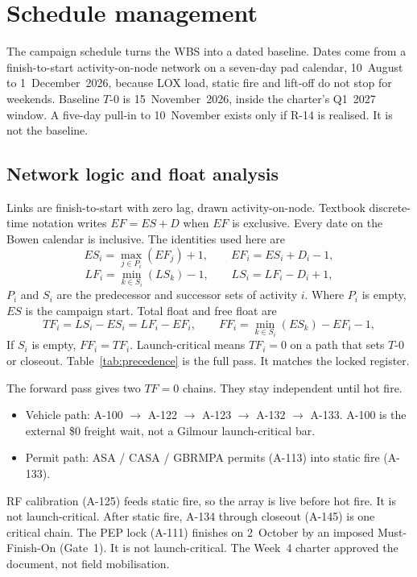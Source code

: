 \section{Schedule management}
\label{sec:schedule}

The campaign schedule turns the WBS into a dated baseline. Dates come from a finish-to-start activity-on-node network on a seven-day pad calendar, 10~August to 1~December~2026, because LOX load, static fire and lift-off do not stop for weekends. Baseline $T$-0 is 15~November~2026, inside the charter's Q1~2027 window. A five-day pull-in to 10~November exists only if R-14 is realised. It is not the baseline.

\subsection{Network logic and float analysis}
\label{sec:schedule-network}

Links are finish-to-start with zero lag, drawn activity-on-node. Textbook discrete-time notation writes $EF = ES + D$ when $EF$ is exclusive. Every date on the Bowen calendar is inclusive. The identities used here are
\begin{equation}
ES_{i} = \max_{j \in P_{i}}(EF_{j}) + 1,
\qquad
EF_{i} = ES_{i} + D_{i} - 1,
\label{eq:fwd}
\end{equation}
\begin{equation}
LF_{i} = \min_{k \in S_{i}}(LS_{k}) - 1,
\qquad
LS_{i} = LF_{i} - D_{i} + 1,
\label{eq:bwd}
\end{equation}
$P_{i}$ and $S_{i}$ are the predecessor and successor sets of activity $i$. Where $P_{i}$ is empty, $ES$ is the campaign start. Total float and free float are
\begin{equation}
TF_{i} = LS_{i} - ES_{i} = LF_{i} - EF_{i},
\qquad
FF_{i} = \min_{k \in S_{i}}(ES_{k}) - EF_{i} - 1,
\label{eq:float}
\end{equation}
If $S_{i}$ is empty, $FF_{i} = TF_{i}$. Launch-critical means $TF_{i} = 0$ on a path that sets $T$-0 or closeout. Table~\ref{tab:precedence} is the full pass. It matches the locked register.

The forward pass gives two $TF = 0$ chains. They stay independent until hot fire.
\begin{itemize}[leftmargin=1.4em,itemsep=0.25em]
\item Vehicle path: A-100 $\rightarrow$ A-122 $\rightarrow$ A-123 $\rightarrow$ A-132 $\rightarrow$ A-133. A-100 is the external \$0 freight wait, not a Gilmour launch-critical bar.
\item Permit path: ASA / CASA / GBRMPA permits (A-113) into static fire (A-133).
\end{itemize}
RF calibration (A-125) feeds static fire, so the array is live before hot fire. It is not launch-critical. After static fire, A-134 through closeout (A-145) is one critical chain. The PEP lock (A-111) finishes on 2~October by an imposed Must-Finish-On (Gate~1). It is not launch-critical. The Week~4 charter approved the document, not field mobilisation.

